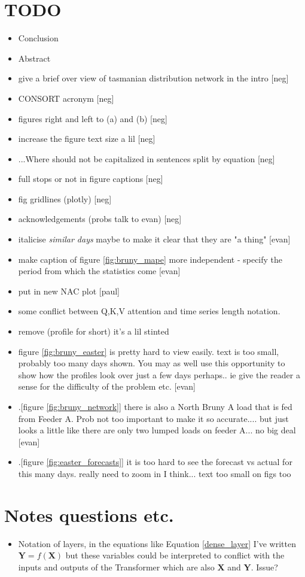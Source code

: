 \documentclass[conference]{IEEEtran}
\begin{document}
\section{TODO} 
\begin{itemize}
	\item Conclusion
	\item Abstract
	\item give a brief over view of tasmanian distribution network in the intro [neg]
	\item CONSORT acronym [neg]
	\item figures right and left to (a) and (b) [neg]
	\item increase the figure text size a lil [neg]
	\item ...Where should not be capitalized in sentences split by equation [neg]
	\item full stops or not in figure captions [neg]
	\item fig gridlines (plotly) [neg]
	\item acknowledgements (probs talk to evan) [neg]
	\item italicise \textit{similar days} maybe to make it clear that they are "a thing" [evan]
	\item make caption of figure \ref{fig:bruny_mape} more independent - specify the period from which the statistics come [evan]
	\item put in new NAC plot [paul]
	\item some conflict between Q,K,V attention and time series length notation.
	\item remove (profile for short) it's a lil stinted
	\item figure \ref{fig:bruny_easter} is pretty hard to view easily. text is too small, probably too many days shown. You may as well use this opportunity to show how the profiles look over just a few days perhaps.. ie give the reader a sense for the difficulty of the problem etc. [evan]
	\item  .[figure \ref{fig:bruny_network}]  there is also a North Bruny A load  that is fed from Feeder A. Prob not too important to make it so accurate.... but just looks a little like there are only two lumped loads on feeder A... no big deal  [evan]
	\item .[figure \ref{fig:easter_forecasts}] it is too hard to see the forecast vs actual for this many days. really need to zoom in I think... text too small on figs too
	
\end{itemize}

\section{Notes questions etc.} 
\begin{itemize}
	\item Notation of layers, in the equations like Equation \ref{dense_layer} I've written $\textbf{Y} = f(\textbf{X})$ but these variables could be interpreted to conflict with the inputs and outputs of the Transformer which are also $\textbf{X}$ and $\textbf{Y}$. Issue?
\end{itemize}
\end{document}
